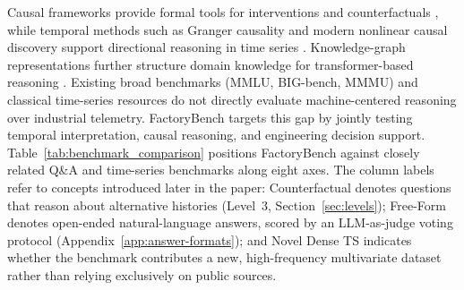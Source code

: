 Causal frameworks provide formal tools for interventions and counterfactuals \cite{pearl2009causality,peters2017elements,rubin1974causal}, while temporal methods such as Granger causality and modern nonlinear causal discovery support directional reasoning in time series \cite{granger1969causal,runge2019causal}. Knowledge-graph representations further structure domain knowledge for transformer-based reasoning \cite{petersen2026structuralinductivebiashelps}. Existing broad benchmarks (MMLU, BIG-bench, MMMU) \cite{hendrycks2021mmlu,srivastava2023bigbench,yue2024mmmu} and classical time-series resources \cite{laptev2015generic,dau2019ucr,wen2022transformers} do not directly evaluate machine-centered reasoning over industrial telemetry. FactoryBench targets this gap by jointly testing temporal interpretation, causal reasoning, and engineering decision support. Table~\ref{tab:benchmark_comparison} positions FactoryBench against closely related Q\&A and time-series benchmarks along eight axes. The column labels refer to concepts introduced later in the paper: Counterfactual denotes questions that reason about alternative histories (Level~3, Section~\ref{sec:levels}); Free-Form denotes open-ended natural-language answers, scored by an LLM-as-judge voting protocol (Appendix~\ref{app:answer-formats}); and Novel Dense TS indicates whether the benchmark contributes a new, high-frequency multivariate dataset rather than relying exclusively on public sources.

